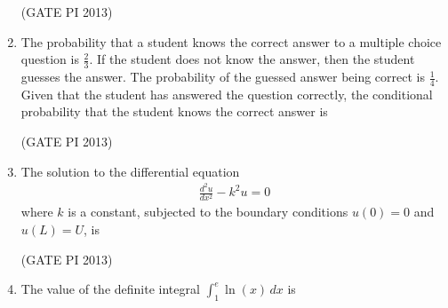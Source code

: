 \documentclass[journal,12pt,onecolumn]{IEEEtran}
\theoremstyle{remark}
\begin{document}
\begin{enumerate}
\hfill (GATE PI 2013)


\item The probability that a student knows the correct answer to a multiple choice question is $ \frac{2}{3} $. If the student does not know the answer, then the student guesses the answer. The probability of the guessed answer being correct is $ \frac{1}{4} $. Given that the student has answered the question correctly, the conditional probability that the student knows the correct answer is
\begin{enumerate}
\end{enumerate}

\hfill (GATE PI 2013)


\item The solution to the differential equation 
\begin{align*}
\frac{d^2 u}{dx^2} - k^2 u = 0
\end{align*}
where $k$ is a constant, subjected to the boundary conditions $u(0) = 0$ and $u(L) = U$, is
\begin{enumerate}
\end{enumerate}

\hfill (GATE PI 2013)

\item The value of the definite integral 
$
\int_1^e \ln(x) \, dx
$
is
\begin{enumerate}
\end{enumerate}


\end{enumerate}
\end{document}
